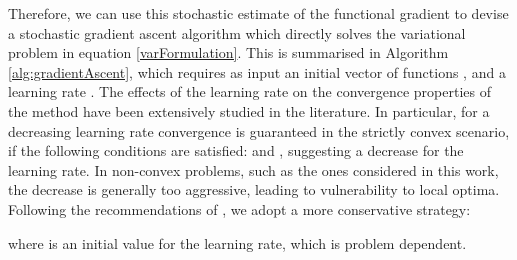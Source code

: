 Therefore, we can use this stochastic estimate of the functional gradient to devise a stochastic gradient ascent algorithm which directly solves the variational problem in equation \eqref{varFormulation}.
This is summarised in Algorithm \ref{alg:gradientAscent}, which requires as input an initial vector of functions , and a learning rate .
The effects of the learning rate on the convergence properties of the method have been extensively studied in the literature.
In particular, for a decreasing learning rate convergence is guaranteed in the strictly convex scenario, if the following conditions are satisfied:  and  \cite{Murata1999,Bottou2010}, suggesting a  decrease for the learning rate.
In non-convex problems, such as the ones considered in this work, the  decrease is generally too aggressive, leading to vulnerability to local optima.
Following the recommendations of \cite{Bottou2012}, we adopt a more conservative strategy:

where  is an initial value for the learning rate, which is problem dependent.

















